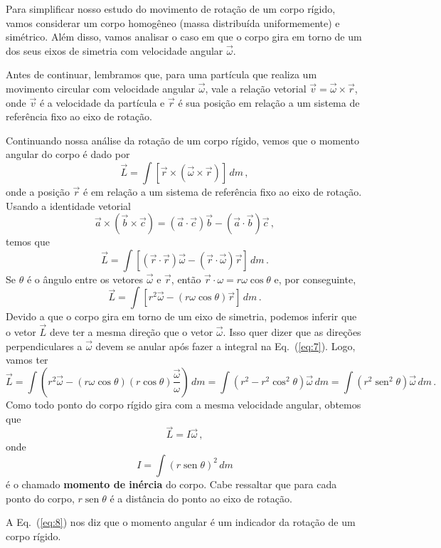 \documentclass[12pt,a4paper]{article}
\newcommand{\dpar}[1]{\left(#1\right)}
\theoremstyle{definition}
\DeclareMathOperator{\sen}{sen}
\begin{document}
Para simplificar nosso estudo do movimento de rotação de um corpo
rígido, vamos considerar um corpo homogêneo (massa distribuída
uniformemente) e simétrico. Além disso, vamos analisar o caso em que o
corpo gira em torno de um dos seus eixos de simetria com velocidade
angular $\vec\omega$.

Antes de continuar, lembramos que, para uma partícula que realiza um
movimento circular com velocidade angular $\vec\omega$, vale a relação
vetorial $\vec v=\vec\omega\times\vec r$, onde $\vec v$ é a velocidade
da partícula e $\vec r$ é sua posição em relação a um sistema de
referência fixo ao eixo de rotação.

Continuando nossa análise da rotação de um corpo rígido, vemos que o
momento angular do corpo é dado por
$$\vec L=\int [\vec r\times(\vec\omega\times\vec r)]\,dm\,,$$
onde a posição $\vec r$ é em relação a um sistema de referência fixo
ao eixo de rotação.  Usando a identidade vetorial
$$\vec a\times(\vec b\times\vec c)=(\vec a\cdot\vec c)\vec b-(\vec a\cdot\vec b)\vec c\,,$$
temos que
\begin{equation}
  \label{eq:7}
  \vec L=\int [(\vec r\cdot\vec r)\vec\omega-(\vec r\cdot\vec\omega)\vec r]\,dm\,.
\end{equation}
Se $\theta$ é o ângulo entre os vetores $\vec\omega$ e $\vec r$, então
$\vec r\cdot\omega=r\omega\cos\theta$ e, por conseguinte,
$$\vec L=\int [r^2\vec\omega-(r\omega\cos\theta)\vec r]\,dm\,.$$
Devido a que o corpo gira em torno de um eixo de simetria, podemos
inferir que o vetor $\vec L$ deve ter a mesma direção que o vetor
$\vec\omega$. Isso quer dizer que as direções perpendiculares a
$\vec\omega$ devem se anular após fazer a integral na
Eq.~(\ref{eq:7}). Logo, vamos ter
$$\vec L=\int \dpar{r^2\vec\omega-(r\omega\cos\theta)(r\cos\theta)\frac{\vec\omega}{\omega}}\,dm=\int (r^2-r^2\cos^2\theta)\vec\omega\,dm=\int (r^2\sen^2\theta)\vec\omega\,dm\,.$$
Como todo ponto do corpo rígido gira com a mesma velocidade angular,
obtemos que
\begin{equation}
  \label{eq:8}
  \vec L=I\vec\omega\,,
\end{equation}
onde
\begin{equation}
  \label{eq:9}
  I=\int (r\sen\theta)^2\,dm
\end{equation}
é o chamado \textbf{momento de inércia} do corpo. Cabe ressaltar que
para cada ponto do corpo, $r\sen\theta$ é a distância do ponto ao eixo
de rotação.

A Eq.~(\ref{eq:8}) nos diz que o momento angular é um indicador da
rotação de um corpo rígido.
\end{document}
